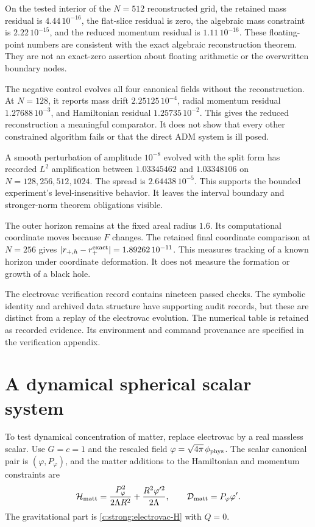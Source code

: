On the tested interior of the $N=512$ reconstructed grid, the retained mass residual is $4.44\,10^{-16}$, the flat-slice residual is zero, the algebraic mass constraint is $2.22\,10^{-15}$, and the reduced momentum residual is $1.11\,10^{-16}$. These floating-point numbers are consistent with the exact algebraic reconstruction theorem. They are not an exact-zero assertion about floating arithmetic or the overwritten boundary nodes.

The negative control evolves all four canonical fields without the reconstruction. At $N=128$, it reports mass drift $2.25125\,10^{-4}$, radial momentum residual $1.27688\,10^{-3}$, and Hamiltonian residual $1.25735\,10^{-2}$. This gives the reduced reconstruction a meaningful comparator. It does not show that every other constrained algorithm fails or that the direct ADM system is ill posed.

A smooth perturbation of amplitude $10^{-8}$ evolved with the split form has recorded $L^2$ amplification between $1.03345462$ and $1.03348106$ on $N=128,256,512,1024$. The spread is $2.64438\,10^{-5}$. This supports the bounded experiment's level-insensitive behavior. It leaves the interval boundary and stronger-norm theorem obligations visible.

The outer horizon remains at the fixed areal radius $1.6$. Its computational coordinate moves because $F$ changes. The retained final coordinate comparison at $N=256$ gives $|r_{+,h}-r_+^{\rm exact}|=1.89262\,10^{-11}$. This measures tracking of a known horizon under coordinate deformation. It does not measure the formation or growth of a black hole.

The electrovac verification record contains nineteen passed checks. The symbolic identity and archived data structure have supporting audit records, but these are distinct from a replay of the electrovac evolution. The numerical table is retained as recorded evidence. Its environment and command provenance are specified in the verification appendix.

\section{A dynamical spherical scalar system}
\label{c:strong:scalar-reduction}

To test dynamical concentration of matter, replace electrovac by a real massless scalar. Use $G=c=1$ and the rescaled field $\varphi=\sqrt{4\pi}\,\phi_{\rm phys}$. The scalar canonical pair is $(\varphi,P_\varphi)$, and the matter additions to the Hamiltonian and momentum constraints are
\begin{equation}
 \mathcal H_{\rm matt}=\frac{P_\varphi^2}{2\Lambda R^2}
                         +\frac{R^2\varphi'^2}{2\Lambda},
 \qquad \mathcal D_{\rm matt}=P_\varphi\varphi'.
\end{equation}
The gravitational part is \eqref{c:strong:electrovac-H} with $Q=0$.

